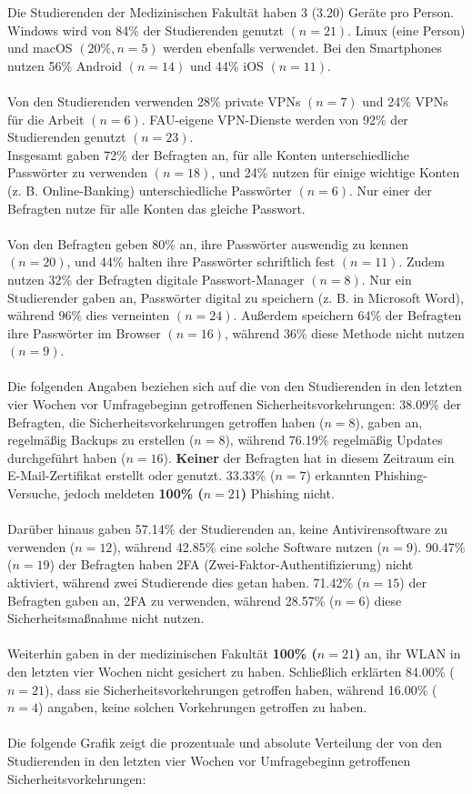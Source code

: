 \documentclass[german,report]{i1thesis}
\begin{document}
Die Studierenden der Medizinischen Fakultät haben 3 (3.20) Geräte pro Person. Windows wird von 84\% der Studierenden genutzt \((n=21)\). Linux (eine Person) und macOS \((20\%, n=5)\) werden ebenfalls verwendet. Bei den Smartphones nutzen 56\% Android \((n=14)\) und 44\% iOS \((n=11)\).\\
\\
Von den Studierenden verwenden 28\% private VPNs \((n=7)\) und 24\% VPNs für die Arbeit \((n=6)\). FAU-eigene VPN-Dienste werden von 92\% der Studierenden genutzt \((n=23)\).
\\
Insgesamt gaben 72\% der Befragten an, für alle Konten unterschiedliche Passwörter zu verwenden \((n=18)\), und 24\% nutzen für einige wichtige Konten (z. B. Online-Banking) unterschiedliche Passwörter \((n=6)\). Nur einer der Befragten nutze für alle Konten das gleiche Passwort.\\
\\
Von den Befragten geben 80\% an, ihre Passwörter auswendig zu kennen \((n=20)\), und 44\% halten ihre Passwörter schriftlich fest \((n=11)\). Zudem nutzen 32\% der Befragten digitale Passwort-Manager \((n=8)\). Nur ein Studierender gaben an, Passwörter digital zu speichern (z. B. in Microsoft Word), während 96\% dies verneinten \((n=24)\). Außerdem speichern 64\% der Befragten ihre Passwörter im Browser \((n=16)\), während 36\% diese Methode nicht nutzen \((n=9)\).\\
\\
Die folgenden Angaben beziehen sich auf die von den Studierenden in den letzten vier Wochen vor Umfragebeginn getroffenen Sicherheitsvorkehrungen: 38.09\% der Befragten, die Sicherheitsvorkehrungen getroffen haben (\(n = 8\)), gaben an, regelmäßig Backups zu erstellen (\(n = 8\)), während 76.19\% regelmäßig Updates durchgeführt haben (\(n = 16\)). \textbf{Keiner} der Befragten hat in diesem Zeitraum ein E-Mail-Zertifikat erstellt oder genutzt. 33.33\% (\(n = 7\)) erkannten Phishing-Versuche, jedoch meldeten \textbf{100\% (\(n = 21\))} Phishing nicht.\\
\\
Darüber hinaus gaben 57.14\% der Studierenden an, keine Antivirensoftware zu verwenden (\(n = 12\)), während 42.85\% eine solche Software nutzen (\(n = 9\)). 90.47\% (\(n = 19\)) der Befragten haben 2FA (Zwei-Faktor-Authentifizierung) nicht aktiviert, während zwei Studierende dies getan haben. 71.42\% (\(n = 15\)) der Befragten gaben an, 2FA zu verwenden, während 28.57\% (\(n = 6\)) diese Sicherheitsmaßnahme nicht nutzen.\\
\\
Weiterhin gaben in der medizinischen Fakultät \textbf{100\% (\(n = 21\))} an, ihr WLAN in den letzten vier Wochen nicht gesichert zu haben. Schließlich erklärten 84.00\% (\(n = 21\)), dass sie Sicherheitsvorkehrungen getroffen haben, während 16.00\% (\(n = 4\)) angaben, keine solchen Vorkehrungen getroffen zu haben.\\
\\
Die folgende Grafik zeigt die prozentuale und absolute Verteilung der von den Studierenden in den letzten vier Wochen vor Umfragebeginn getroffenen Sicherheitsvorkehrungen:
\end{document}
